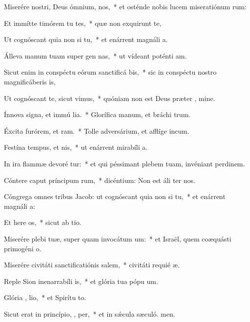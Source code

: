 \item Miserére nostri, Deus ómnium,   nos,~* et osténde nobis lucem miseratiónum rum:
\item Et immítte timórem tu  tes,~* quæ non exquirunt te,
\item Ut cognóscant quia non   si tu,~* et enárrent magnáli a.
\item Álleva manum tuam super gen nas,~* ut vídeant poténti am.
\item Sicut enim in conspéctu eórum sanctificá   bis,~* sic in conspéctu nostro magnificáberis  is,
\item Ut cognóscant te, sicut   vimus,~* quóniam non est Deus præter , mine.
\item Ínnova signa, et immú lia.~* Glorífica manum, et bráchi trum.
\item Éxcita furórem, et  ram.~* Tolle adversárium, et afflíge incum.
\item Festína tempus, et  nis,~* ut enárrent mirabíli a.
\item In ira flammæ devoré  tur:~* et qui péssimant plebem tuam, invéniant perdinem.
\item Cóntere caput príncipum rum,~* dicéntium: Non est áli ter nos.
\item Cóngrega omnes tribus Jacob: ut cognóscant quia non   si tu,~* et enárrent magnáli a:
\item Et here os,~* sicut ab tio.
\item Miserére plebi tuæ, super quam invocátum   um:~* et Israël, quem coæquásti primogéni o.
\item Miserére civitáti sanctificatiónis  salem,~* civitáti requié æ.
\item Reple Sion inenarrabíli  is,~* et glória tua pópu um.
\item Glória ,  lio,~* et Spirítu to.
\item Sicut erat in princípio,  ,  per,~* et in sǽcula sæculó. men.
